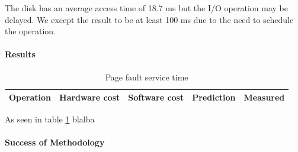 The disk has an average access time of 18.7 ms but the I/O operation may be
delayed.
We except the result to be at least 100 ms due to the need to schedule the
operation.

\paragraph{Results}
\begin{table}[h]
\begin{center}
\begin{tabular}{| l | l | l | l | l |}
\hline
Operation & Hardware cost & Software cost & Prediction & Measured \\
\hline
\end{tabular}
\end{center}
\caption{Page fault service time\label{tab:page-fault}}
\end{table}

As seen in table \ref{tab:page-fault} blalba
\paragraph{Success of Methodology}

